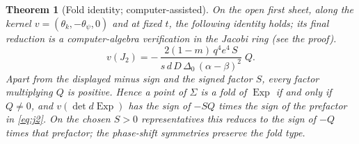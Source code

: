 \documentclass[11pt]{article}
\newtheorem{theorem}{Theorem}[section]
\theoremstyle{remark}
\newcommand{\Exp}{\operatorname{Exp}}
\begin{document}
\begin{theorem}[Fold identity; computer-assisted]\label{thm:fold-identity}
On the open first sheet, along the kernel $v=(\theta_k,-\theta_\psi,0)$ and
at fixed $t$, the following identity holds; its final reduction is a
computer-algebra verification in the Jacobi ring (see the proof).
\begin{equation}\label{eq:fold-identity}
 v(J_2)=-\,\frac{2(1-m)\,q^4e^4\,S}{s\,d\,D\,\Delta_0\,(\alpha-\beta)^2}\;Q .
\end{equation}
Apart from the displayed minus sign and the signed factor $S$, every
factor multiplying $Q$ is positive.  Hence a point of $\Sigma$ is a fold
of $\Exp$ if and only if $Q\ne0$, and $v(\det d\Exp)$ has the sign of
$-SQ$ times the sign of the prefactor in \eqref{eq:j2}.  On the chosen
$S>0$ representatives this reduces to the sign of $-Q$ times that
prefactor; the phase-shift symmetries preserve the fold type.
\end{theorem}
\end{document}
